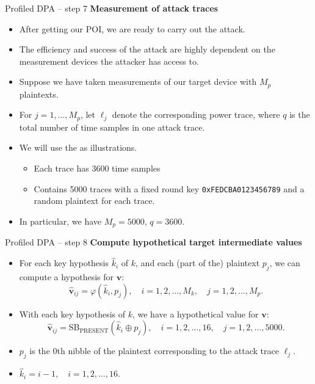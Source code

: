 \begin{frame}{Profiled DPA -- step 7}
    \textbf{Measurement of attack traces}
    \begin{itemize}
        \item After getting our POI, we are ready to carry out the attack.
         \item The efficiency and success of the attack are highly dependent on the measurement devices the attacker has access to.
        \item Suppose we have taken measurements of our target device with $M_p$ plaintexts.
        \item For $j=1,\dots,M_p$, let $\boldsymbol{\ell}_j$ denote the corresponding power trace, where $q$ is the total number of time samples in one attack trace.
    \end{itemize}
     \begin{example}
        \begin{itemize}
            \item We will use the \dataranone as illustrations.
            \begin{itemize}
                \item Each trace has $3600$ time samples
                \item Contains 5000 traces with a fixed round key \texttt{0xFEDCBA0123456789} and a random plaintext for each trace.
            \end{itemize}
            \item In particular, we have $M_p=5000$, $q=3600$.
        \end{itemize}
    \end{example}
\end{frame}

\begin{frame}{Profiled DPA -- step 8}
    \textbf{Compute hypothetical target intermediate values}
    \begin{itemize}
        \item For each key hypothesis $\hat{k}_i$ of $k$, and each (part of the) plaintext $p_j$, we can compute a hypothesis for $\boldsymbol{v}$:
    \[
    \hat{\boldsymbol{v}}_{ij}=\varphi(\hat{k}_i,p_j),\quad i=1,2,\dots,M_k,\quad j=1,2,\dots,M_p.
    \]
    \end{itemize}
    \begin{example}
        \begin{itemize}
            \item With each key hypothesis of $k$, we have a hypothetical value for $\boldsymbol{v}$:
        \[
    \hat{\boldsymbol{v}}_{ij}=\text{SB}_{\text{PRESENT}}(\hat{k}_i\oplus p_j),\quad i=1,2,\dots,16,\quad j=1,2,\dots,5000.
    \]
    \item $p_j$ is the $0$th nibble of the plaintext corresponding to the attack trace $\boldsymbol{\ell}_j$.
    \item $\hat{k}_i=i-1,\quad i=1,2,\dots,16.$
        \end{itemize}
    \end{example}
\end{frame}

